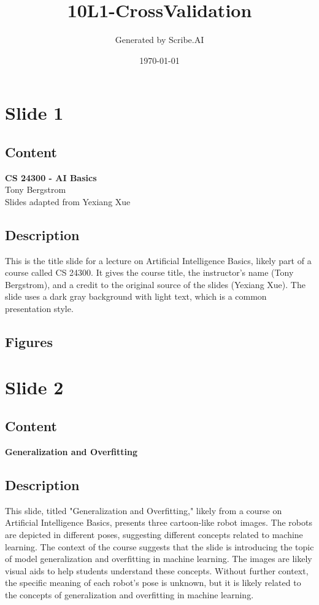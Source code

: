 \documentclass{article}%
\title{10L1{-}CrossValidation}%
\author{Generated by Scribe.AI}%
\date{\today}%
\begin{document}
%
\normalsize%
\maketitle%
\section{Slide 1}%
\label{sec:Slide1}%
\subsection{Content}%

\textbf{CS 24300 - AI Basics} \\
Tony Bergstrom \\
Slides adapted from Yexiang Xue
%
\subsection{Description}%
This is the title slide for a lecture on Artificial Intelligence Basics, likely part of a course called CS 24300.  It gives the course title, the instructor's name (Tony Bergstrom), and a credit to the original source of the slides (Yexiang Xue).  The slide uses a dark gray background with light text, which is a common presentation style.%
\subsection{Figures}%
\begin{figure}[H]%
\centering%
\end{figure}

%
\newpage%
\section{Slide 2}%
\label{sec:Slide2}%
\subsection{Content}%

\textbf{Generalization and Overfitting}
%
\subsection{Description}%
This slide, titled "Generalization and Overfitting," likely from a course on Artificial Intelligence Basics, presents three cartoon-like robot images.  The robots are depicted in different poses, suggesting different concepts related to machine learning.  The context of the course suggests that the slide is introducing the topic of model generalization and overfitting in machine learning.  The images are likely visual aids to help students understand these concepts.  Without further context, the specific meaning of each robot's pose is unknown, but it is likely related to the concepts of generalization and overfitting in machine learning.%
\end{document}
